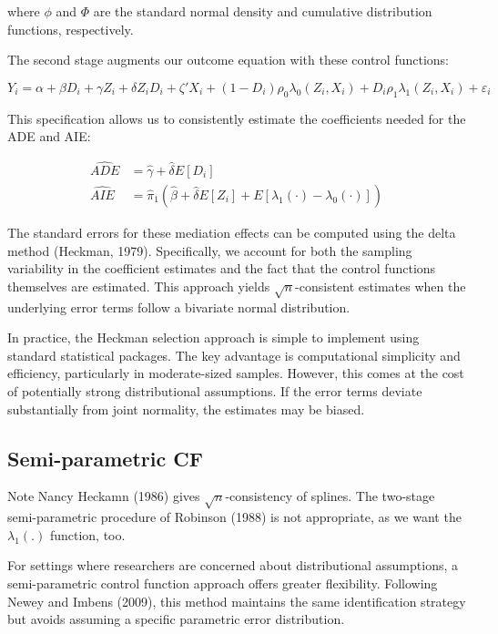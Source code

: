 where $\phi$ and $\Phi$ are the standard normal density and cumulative distribution functions, respectively.

The second stage augments our outcome equation with these control functions:

\begin{equation}
Y_i = \alpha + \beta D_i + \gamma Z_i + \delta Z_i D_i + \zeta' X_i + (1-D_i)\rho_0 \lambda_0(Z_i,X_i) + D_i \rho_1 \lambda_1(Z_i,X_i) + \varepsilon_i
\end{equation}

This specification allows us to consistently estimate the coefficients needed for the ADE and AIE:

\begin{align}
\widehat{ADE} &= \hat{\gamma} + \hat{\delta}E[D_i] \\
\widehat{AIE} &= \hat{\pi}_1(\hat{\beta} + \hat{\delta}E[Z_i] + E[\lambda_1(\cdot) - \lambda_0(\cdot)])
\end{align}

The standard errors for these mediation effects can be computed using the delta method (Heckman, 1979). Specifically, we account for both the sampling variability in the coefficient estimates and the fact that the control functions themselves are estimated. This approach yields $\sqrt{n}$-consistent estimates when the underlying error terms follow a bivariate normal distribution.

In practice, the Heckman selection approach is simple to implement using standard statistical packages. The key advantage is computational simplicity and efficiency, particularly in moderate-sized samples. However, this comes at the cost of potentially strong distributional assumptions. If the error terms deviate substantially from joint normality, the estimates may be biased.

\subsection{Semi-parametric CF}
Note Nancy Heckamn (1986) gives $\sqrt{n}$-consistency of splines.
The two-stage semi-parametric procedure of Robinson (1988) is not appropriate, as we want the $\lambda_1(.)$ function, too.


For settings where researchers are concerned about distributional assumptions, a semi-parametric control function approach offers greater flexibility. Following Newey and Imbens (2009), this method maintains the same identification strategy but avoids assuming a specific parametric error distribution.

